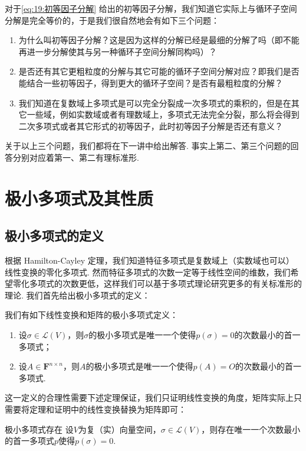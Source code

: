 对于\autoref{eq:19:初等因子分解} 给出的初等因子分解，我们知道它实际上与循环子空间分解是完全等价的，于是我们很自然地会有如下三个问题：
\begin{enumerate}
    \item 为什么叫初等因子分解？这是因为这样的分解已经是最细的分解了吗（即不能再进一步分解使其与另一种循环子空间分解同构吗）？
    \item 是否还有其它更粗粒度的分解与其它可能的循环子空间分解对应？即我们是否能结合一些初等因子，得到更大的循环子空间？是否有最粗粒度的分解？
    \item 我们知道在复数域上多项式是可以完全分裂成一次多项式的乘积的，但是在其它一些域，例如实数域或者有理数域上，多项式无法完全分裂，那么将会得到二次多项式或者其它形式的初等因子，此时初等因子分解是否还有意义？
\end{enumerate}

关于以上三个问题，我们都将在下一讲中给出解答. 事实上第二、第三个问题的回答分别对应着第一、第二有理标准形.

\section{极小多项式及其性质}
\subsection{极小多项式的定义}

根据 Hamilton-Cayley 定理，我们知道特征多项式是复数域上（实数域也可以）线性变换的零化多项式. 然而特征多项式的次数一定等于线性空间的维数，我们希望零化多项式的次数更低，这样我们可以基于多项式理论研究更多的有关标准形的理论. 我们首先给出极小多项式的定义：
\begin{definition}{}{}
    我们有如下线性变换和矩阵的极小多项式定义：
    \begin{enumerate}
        \item 设$\sigma\in \mathcal{L}(V)$，则$\sigma$的极小多项式是唯一一个使得$p(\sigma)=0$的次数最小的首一多项式；

        \item 设$A\in\mathbf{F}^{n\times n}$，则$A$的极小多项式是唯一一个使得$p(A)=O$的次数最小的首一多项式.
    \end{enumerate}
\end{definition}
这一定义的合理性需要下述定理保证，我们只证明线性变换的角度，矩阵实际上只需要将定理和证明中的线性变换替换为矩阵即可：
\begin{theorem}{}{极小多项式存在}
    设$V$为复（实）向量空间，$\sigma\in \mathcal{L}(V)$，则存在唯一一个次数最小的首一多项式$p$使得$p(\sigma)=0$.
\end{theorem}

